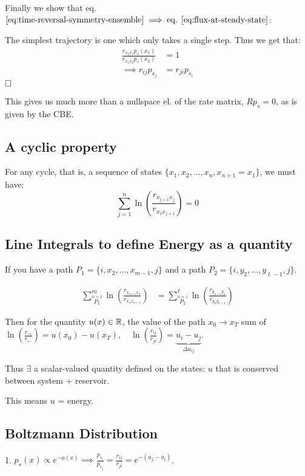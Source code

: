 Finally we show that eq. $\eqref{eq:time-reversal-symmetry-ensemble}\implies \text{eq. }\eqref{eq:flux-at-steady-state}$:

The simplest trajectory is one which only takes a single step. Thus we get that:
\begin{align*}
    \frac{r_{x_2 x_1} p_s(x_1)}{r_{x_1 x_2} p_s(x_2)} &= 1
    \\
    \implies 
    r_{ij}p_{s_j}
    &= 
    r_{ji}p_{s_i}
\end{align*}
$\hfill\square$

This gives us much more than a nullspace el. of the rate matrix, $Rp_s=0$, as is given by the CBE.

\subsection{A cyclic property}
For any cycle, that is, a sequence of states $\{x_1, x_2, \ldots, x_n, x_{n+1}=x_1\}$, we must have:
\begin{equation}
    \sum_{j=1}^n \ln\left(\frac{r_{x_{j+1} x_j}}{r_{x_1 x_{j+1}}}\right)
    = 0
\end{equation}

\subsection{Line Integrals to define Energy as a quantity}
If you have a path $P_1=\{i, x_2, \ldots, x_{m-1}, j\}$ and a path $P_2=\{i, y_2, \ldots, y_{\ell-1}, j\}$.

\begin{align}
    \sum_{\stackrel{n=1}{P_1}}^m \ln\left(\frac{r_{x_{n+1} x_n}}{r_{x_n x_{n+1}}}\right)
    &= \sum_{\stackrel{n=1}{P_2}}^{\ell} \ln\left(\frac{r_{y_{n+1} y_{n}}}{r_{y_{n} y_{n+1}}}\right)
\end{align}

Then for the quantity $u(x)\in\mathbb{R}$, the value of the path $x_0\to x_T$ sum of $\ln(\frac{r_\to}{r_{\leftarrow}})=u(x_0)-u(x_T), \quad \ln\left(\frac{r_{ij}}{r_{ji}}\right)=\underbrace{u_i-u_j}_{\Delta u_{ij}}$.

Thus $\exists$ a scalar-valued quantity defined on the states: $u$ that is conserved between system + reservoir.

This means $u$ = energy.

\subsection{Boltzmann Distribution}
1. $p_s(x)\propto e^{-u(x)}\implies \frac{p_{s_i}}{p_{s_j}} = \frac{r_{ij}}{r_{ji}}=e^{-(u_j-u_i)}$.

